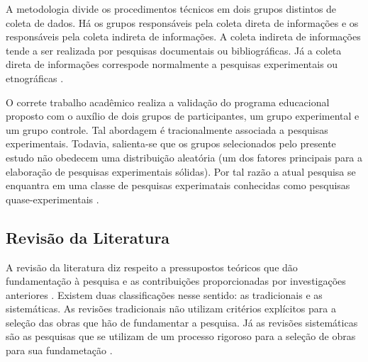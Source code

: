 A metodologia divide os procedimentos técnicos em dois grupos distintos de coleta de dados. Há os grupos responsáveis pela coleta direta de informações e os responsáveis pela coleta indireta de informações. A coleta indireta de informações tende a ser realizada por pesquisas documentais ou bibliográficas. Já a coleta direta de informações correspode normalmente a pesquisas experimentais ou etnográficas \cite{cordova2009pesquisa}. 

O correte trabalho acadêmico realiza a validação do programa educacional proposto com o auxílio de dois grupos de participantes, um grupo experimental e um grupo controle. Tal abordagem é tracionalmente associada a pesquisas experimentais. Todavia, salienta-se que os grupos selecionados pelo presente estudo não obedecem uma distribuição aleatória (um dos fatores principais para a elaboração de pesquisas experimentais sólidas). Por tal razão a atual pesquisa se enquantra em uma classe de pesquisas experimatais conhecidas como pesquisas quase-experimentais .










\subsection{Revisão da Literatura}\label{sub:literatura}

\vspace{-0.13cm}

A revisão da literatura diz respeito a pressupostos teóricos que dão fundamentação à pesquisa e as contribuições proporcionadas por investigações anteriores \cite{carlos2002elaborar}. Existem duas classificações nesse sentido: as tradicionais e as sistemáticas. As revisões tradicionais não utilizam critérios explícitos para a seleção das obras que hão de fundamentar a pesquisa. Já as revisões sistemáticas são as pesquisas que se utilizam de um processo rigoroso para a seleção de obras para sua fundametação \cite{ferenhof2016desmistificando}.

